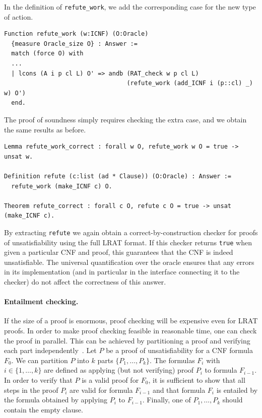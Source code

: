 \documentclass{article}
\begin{document}
In the definition of \lstinline+refute_work+, we add the corresponding case for the new type of action.

\begin{lstlisting}
Function refute_work (w:ICNF) (O:Oracle)
  {measure Oracle_size O} : Answer :=
  match (force O) with
  ...
  | lcons (A i p cl L) O' => andb (RAT_check w p cl L)
                                  (refute_work (add_ICNF i (p::cl) _) w) O')
  end.
\end{lstlisting}

The proof of soundness simply requires checking the extra case, and we obtain the same results as before.

\begin{lstlisting}
Lemma refute_work_correct : forall w O, refute_work w O = true -> unsat w.

Definition refute (c:list (ad * Clause)) (O:Oracle) : Answer :=
  refute_work (make_ICNF c) O.

Theorem refute_correct : forall c O, refute c O = true -> unsat (make_ICNF c).
\end{lstlisting}

By extracting \lstinline+refute+ we again obtain a correct-by-construction checker for proofs of unsatisfiability using
the full LRAT format.
If this checker returns \lstinline+true+ when given a particular CNF and proof, this guarantees that the CNF is indeed
unsatisfiable.
The universal quantification over the oracle ensures that any errors in its implementation (and in particular in the
interface connecting it to the checker) do not affect the correctness of this answer.

\paragraph{Entailment checking.}
If the size of a proof is enormous, proof checking will be expensive even for LRAT proofs. In order to make proof 
checking feasible in reasonable time, one can check the proof in parallel. This can be achieved by partitioning a proof 
and verifying each part independently~\cite{cpp}. Let $P$ be a proof of unsatisfiability for a CNF formula $F_0$. 
We can partition $P$ into $k$ parts $\{P_1, \dots, P_k\}$. The formulas $F_i$ with $i \in \{1, \dots, k\}$ are defined as
applying (but not verifying) proof $P_i$ to formula $F_{i-1}$. In order to verify that $P$ is a valid proof for $F_0$, 
it is sufficient to show that all steps in the proof $P_i$ are valid for formula $F_{i-1}$ and that formula $F_i$ is
entailed by the formula obtained by applying $P_i$ to $F_{i-1}$. Finally, one of $P_1, \dots, P_k$ should contain the empty clause.
\end{document}
